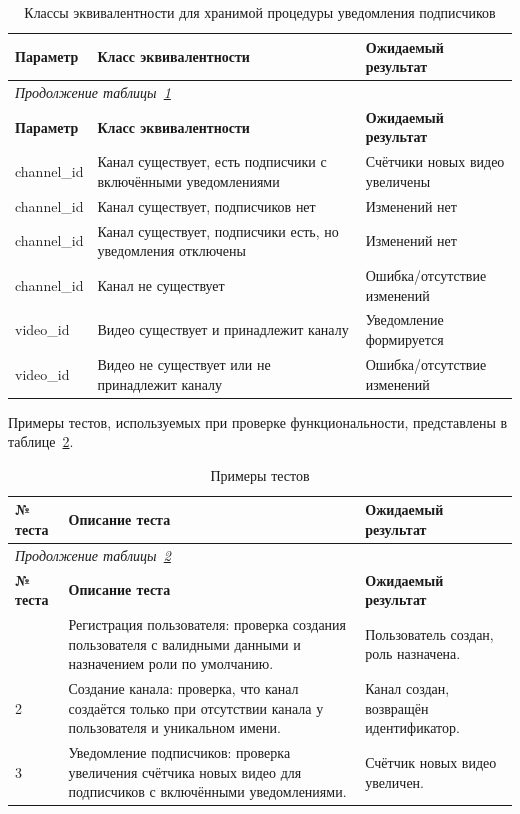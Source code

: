 \begin{longtable}{|p{2.3cm}|p{7cm}|p{5.5cm}|}
    \caption{Классы эквивалентности для хранимой процедуры уведомления подписчиков}\label{tab:sql_eq_classes} \\
    \hline
    \textbf{Параметр} & \textbf{Класс эквивалентности} & \textbf{Ожидаемый результат} \\
    \hline
    \endfirsthead
    \multicolumn{3}{l}{\textit{Продолжение таблицы~\ref{tab:sql_eq_classes}}} \\
    \hline
    \textbf{Параметр} & \textbf{Класс эквивалентности} & \textbf{Ожидаемый результат} \\
    \hline
    \endhead
    \endfoot
    \endlastfoot
    channel\_id & Канал существует, есть подписчики с включёнными уведомлениями & Счётчики новых видео увеличены \\
    \hline
    channel\_id & Канал существует, подписчиков нет & Изменений нет \\
    \hline
    channel\_id & Канал существует, подписчики есть, но уведомления отключены & Изменений нет \\
    \hline
    channel\_id & Канал не существует & Ошибка/отсутствие изменений \\
    \hline
    video\_id & Видео существует и принадлежит каналу & Уведомление формируется \\
    \hline
    video\_id & Видео не существует или не принадлежит каналу & Ошибка/отсутствие изменений \\
    \hline
\end{longtable}

Примеры тестов, используемых при проверке функциональности, представлены в таблице~\ref{tab:test_examples}.

\begin{longtable}{|p{2cm}|p{9cm}|p{4cm}|}
    \caption{Примеры тестов}\label{tab:test_examples} \\
    \hline
    \textbf{№ теста} & \textbf{Описание теста} & \textbf{Ожидаемый результат} \\
    \hline
    \endfirsthead
    \multicolumn{3}{l}{\textit{Продолжение таблицы~\ref{tab:test_examples}}} \\
    \hline
    \textbf{№ теста} & \textbf{Описание теста} & \textbf{Ожидаемый результат} \\
    \hline
    \endhead
    \endfoot
    \endlastfoot
    1 & Регистрация пользователя: проверка создания пользователя с валидными данными и назначением роли по умолчанию. & Пользователь создан, роль назначена. \\
    \hline
    2 & Создание канала: проверка, что канал создаётся только при отсутствии канала у пользователя и уникальном имени. & Канал создан, возвращён идентификатор. \\
    \hline
    3 & Уведомление подписчиков: проверка увеличения счётчика новых видео для подписчиков с включёнными уведомлениями. & Счётчик новых видео увеличен. \\
    \hline
\end{longtable}

